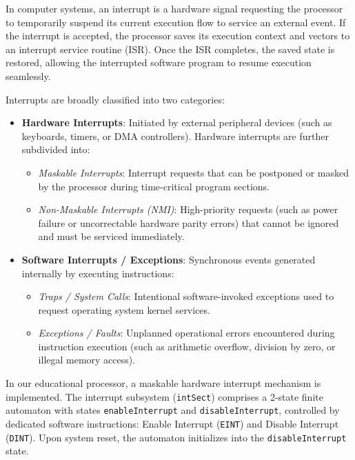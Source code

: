 In computer systems, an interrupt is a hardware signal requesting the processor to temporarily suspend its current execution flow to service an external event. If the interrupt is accepted, the processor saves its execution context and vectors to an interrupt service routine (ISR). Once the ISR completes, the saved state is restored, allowing the interrupted software program to resume execution seamlessly.

Interrupts are broadly classified into two categories:
\begin{itemize}
    \item \textbf{Hardware Interrupts}: Initiated by external peripheral devices (such as keyboards, timers, or DMA controllers). Hardware interrupts are further subdivided into:
    \begin{itemize}
        \item \textit{Maskable Interrupts}: Interrupt requests that can be postponed or masked by the processor during time-critical program sections.
        \item \textit{Non-Maskable Interrupts (NMI)}: High-priority requests (such as power failure or uncorrectable hardware parity errors) that cannot be ignored and must be serviced immediately.
    \end{itemize}
    \item \textbf{Software Interrupts / Exceptions}: Synchronous events generated internally by executing instructions:
    \begin{itemize}
        \item \textit{Traps / System Calls}: Intentional software-invoked exceptions used to request operating system kernel services.
        \item \textit{Exceptions / Faults}: Unplanned operational errors encountered during instruction execution (such as arithmetic overflow, division by zero, or illegal memory access).
    \end{itemize}
\end{itemize}

In our educational processor, a maskable hardware interrupt mechanism is implemented. The interrupt subsystem (\texttt{intSect}) comprises a 2-state finite automaton with states \texttt{enableInterrupt} and \texttt{disableInterrupt}, controlled by dedicated software instructions: Enable Interrupt (\texttt{EINT}) and Disable Interrupt (\texttt{DINT}). Upon system reset, the automaton initializes into the \texttt{disableInterrupt} state. 

